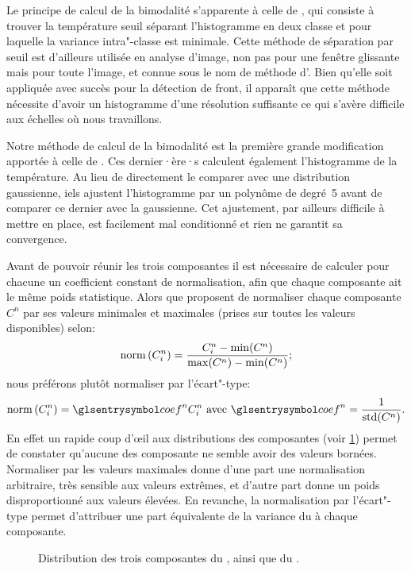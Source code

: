 Le principe de calcul de la bimodalité s'apparente à celle de \textcite{cayula_1992}, qui consiste à trouver la température seuil séparant l'histogramme en deux classe et pour laquelle la variance intra"-classe est minimale.
Cette méthode de séparation par seuil est d'ailleurs utilisée en analyse d'image, non pas pour une fenêtre glissante mais pour toute l'image, et connue sous le nom de méthode d'\textcite{otsu_1979}.
Bien qu'elle soit appliquée avec succès pour la détection de front, il apparaît que cette méthode nécessite d'avoir un histogramme d'une résolution suffisante ce qui s'avère difficile aux échelles où nous travaillons.

Notre méthode de calcul de la bimodalité est la première grande modification apportée à celle de \textcite{liu_2016}.
Ces dernier·ère·s calculent également l'histogramme de la température. Au lieu de directement le comparer avec une distribution gaussienne, iels ajustent l'histogramme par un polynôme de degré~5 avant de comparer ce dernier avec la gaussienne.
Cet ajustement, par ailleurs difficile à mettre en place, est facilement mal conditionné et rien ne garantit sa convergence.

Avant de pouvoir réunir les trois composantes il est nécessaire de calculer pour chacune un coefficient constant de normalisation, afin que chaque composante ait le même poids statistique.
Alors que \textcite{liu_2016} proposent de normaliser chaque composante \(C^n\) par ses valeurs minimales et maximales (prises sur toutes les valeurs disponibles) selon:
\begin{equation}
  \operatorname{norm}\left(C_i^n\right) = \frac {C_i^n - \min(C^n)} {\max(C^n) - \min(C^n)} ;
\end{equation}
nous préférons plutôt normaliser par l'écart"-type:
\begin{equation}
  \norm{C_i^n} = \am{coef}^n C_i^n
  \text{ avec } \am{coef}^n = \frac {1} {\std(C^n)} .
\end{equation}
En effet un rapide coup d’œil aux distributions des composantes (voir \cref{fig:distrib-composantes}) permet de constater qu'aucune des composante ne semble avoir des valeurs bornées.
Normaliser par les valeurs maximales donne d'une part une normalisation arbitraire, très sensible aux valeurs extrêmes, et d'autre part donne un poids disproportionné aux valeurs élevées.
En revanche, la normalisation par l'écart"-type permet d'attribuer une part équivalente de la variance du  à chaque composante.

\begin{figure}
  \caption[Distribution des composantes du  et du ]{Distribution des trois composantes du , ainsi que du .}
  \label{fig:distrib-composantes}
\end{figure}

